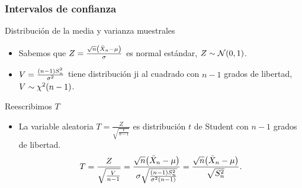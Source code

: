 \documentclass[table]{beamer}
\begin{document}
\begin{frame}
    \frametitle{Intervalos de confianza}
    \begin{block}{Distribución de la media y varianza muestrales}
        \begin{itemize}
            \item Sabemos que $Z = \frac{\sqrt{n} \parens{\bar{X}_{n} - \mu}}{\sigma}$ es normal estándar, $Z \sim \normal{0}{1}$.
            \item $V =  \frac{\parens{n - 1} S^{2}_{n}}{\sigma^{2}}$ tiene distribución ji al cuadrado con $n - 1$ grados de libertad, $V \sim \chidist{n - 1}$.
        \end{itemize}
    \end{block}
    \begin{block}{Reescribimos $T$}
        \begin{itemize}
            \item La variable aleatoria $T = \frac{Z}{\sqrt{\frac{V}{n - 1}}}$ es distribución $t$ de Student con $n - 1$ grados de libertad.
                \begin{equation*}
                    T = \frac{Z}{\sqrt{\frac{V}{n - 1}}}
                    = \frac{\sqrt{n} \parens{\bar{X}_{n} - \mu}}{\sigma \sqrt{\frac{\parens{n - 1} S^{2}_{n}}{\sigma^{2} \parens{n - 1}}}}
                    = \frac{\sqrt{n} \parens{\bar{X}_{n} - \mu}}{\sqrt{S^{2}_{n}}} .
                \end{equation*}
        \end{itemize}
    \end{block}
\end{frame}
\end{document}
